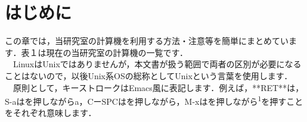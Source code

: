 \documentclass[main]{subfiles}
\begin{document}
\chapter{はじめに}
\fontsize{10}{7} \selectfont
この章では，当研究室の計算機を利用する方法・注意等を簡単にまとめています．表１は現在の当研究室の計算機の一覧です．\\
　LinuxはUnixではありませんが，本文書が扱う範囲で両者の区別が必要になることはないので，以後Unix系OSの総称としてUnixという言葉を使用します．\\
　原則として，キーストロークはEmacs風に表記します．例えば，**RET**は，S-aはを押しながらa，CーSPCはを押しながら，M-xはを押しながら\textsuperscript{1}を押すことをそれぞれ意味します．
\end{document}
